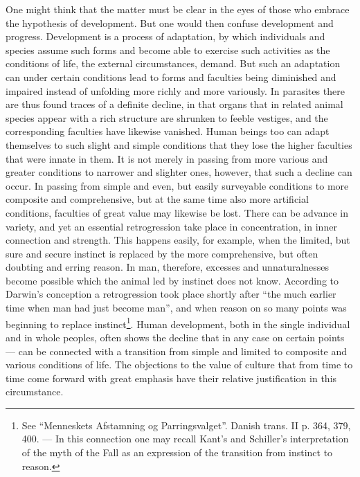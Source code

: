 \documentclass[12pt,a4paper,openany]{book}
\newcommand{\opage}[1]{\marginnote{\footnotesize\textit{[#1]}}}
\begin{document}
One might think that the matter must be clear in the
eyes of those who embrace the hypothesis of development. But one would then
confuse development and progress. Development is a
process of adaptation, by which individuals and species assume
such forms and become able to exercise such
activities as the conditions of life, the external circumstances, demand.
\opage{143}But such an adaptation can under certain conditions lead
to forms and faculties being diminished and impaired instead
of unfolding more richly and more variously. In parasites
there are thus found traces of a definite decline, in that organs
that in related animal species appear with a rich structure
are shrunken to feeble vestiges, and the corresponding
faculties have likewise vanished. Human beings too can
adapt themselves to such slight and simple conditions that they lose
the higher faculties that were innate in them. It is not
merely in passing from more various and greater conditions
to narrower and slighter ones, however, that such a decline can occur.
In passing from simple and even, but easily surveyable
conditions to more composite and comprehensive, but at the same time
also more artificial conditions, faculties of great value
may likewise be lost. There can be advance in variety, and
yet an essential retrogression take place in concentration,
in inner connection and strength. This happens easily, for example, when
the limited, but sure and secure instinct is replaced by the
more comprehensive, but often doubting and erring reason. In
man, therefore, excesses and unnaturalnesses become possible
which the animal led by instinct does not know. According to Darwin's
conception a retrogression took place shortly after ``the much
earlier time when man had just become man'',
and when reason on so many points was beginning to replace
instinct\footnote{See ``Menneskets Afstamning og Parringsvalget''. Danish trans. II
p. 364, 379, 400. --- In this connection one may recall Kant's
and Schiller's interpretation of the myth of the Fall as an expression of
the transition from instinct to reason.}. Human development, both in the
single individual and in whole peoples, often shows the
decline that in any case on certain points --- can
be connected with a transition from simple and limited
to composite and various conditions of life. The
objections to the value of culture that from time to time come forward
with great emphasis have their relative justification in
this circumstance.
\end{document}
